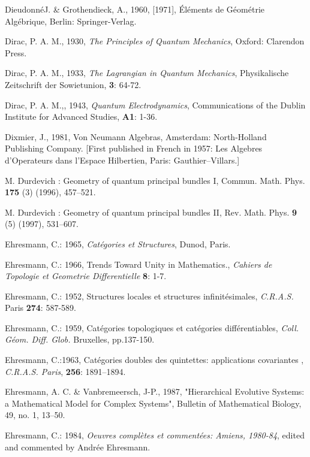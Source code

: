 \documentclass[12pt]{article}
\begin{document}
\begin{thebibliography}{399}
Dieudonn\'eJ. \& Grothendieck, A., 1960, [1971], \'El\'ements de G\'eom\'etrie Alg\'ebrique, Berlin: Springer-Verlag.  

Dirac, P. A. M., 1930, {\em The Principles of Quantum Mechanics}, Oxford: Clarendon 
Press. 

Dirac, P. A. M., 1933, {\em The Lagrangian in Quantum Mechanics}, Physikalische 
Zeitschrift der Sowietunion, \textbf{3}: 64-72. 

Dirac, P. A. M.,, 1943, {\em Quantum Electrodynamics}, Communications of the Dublin 
Institute for Advanced Studies, \textbf{A1}: 1-36. 

Dixmier, J., 1981, Von Neumann Algebras, Amsterdam: North-Holland Publishing 
Company. [First published in French in 1957: Les Algebres d'Operateurs dans 
l'Espace Hilbertien, Paris: Gauthier--Villars.]

M. Durdevich : Geometry of quantum principal bundles I, Commun.
Math. Phys. \textbf{175} (3) (1996), 457--521.

M. Durdevich : Geometry of quantum principal bundles II, Rev.
Math. Phys. \textbf{9} (5) (1997), 531--607.

Ehresmann, C.: 1965, \emph{Cat\'egories et Structures}, Dunod, Paris.

Ehresmann, C.: 1966, Trends Toward Unity in Mathematics.,
\emph{Cahiers de Topologie et Geometrie Differentielle}
\textbf{8}: 1-7.

Ehresmann, C.: 1952, Structures locales et structures infinit\'esimales,
\emph{C.R.A.S.} Paris \textbf{274}: 587-589.

Ehresmann, C.: 1959, Cat\'egories topologiques et cat\'egories
diff\'erentiables, \emph{Coll. G\'eom. Diff. Glob.} Bruxelles, pp.137-150.

Ehresmann, C.:1963, Cat\'egories doubles des quintettes: applications covariantes
, \emph{C.R.A.S. Paris}, \textbf{256}: 1891--1894.

Ehresmann, A. C. \& Vanbremeersch, J-P., 1987, "Hierarchical Evolutive Systems: a Mathematical Model for Complex Systems", Bulletin of Mathematical Biology, 49, no. 1, 13--50.

Ehresmann, C.: 1984, \emph{Oeuvres compl\`etes et  comment\'ees:
Amiens, 1980-84}, edited and commented by Andr\'ee Ehresmann.


\end{thebibliography}
\end{document}
